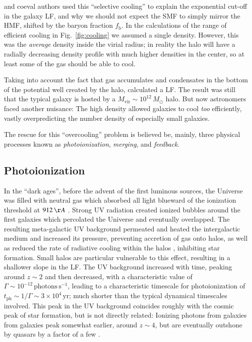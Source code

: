 \documentclass[useAMS]{aa}
\begin{document}
\citet{Rees1977} and coeval authors \citep[e.g.][]{Binney1977,Silk1977} used this ``selective cooling'' to explain the exponential cut-off in the galaxy LF, and why we should not expect the SMF to simply mirror the HMF, shifted by the baryon fraction $f_\mathrm{b}$.
In the calculations of the range of efficient cooling in Fig.~\ref{fig:cooling} we assumed a single density.
However, this was the \emph{average} density inside the virial radius; in reality the halo will have a radially decreasing density profile with much higher densities in the center, so at least some of the gas should be able to cool.

Taking into account the fact that gas accumulates and condensates in the bottom of the potential well created by the halo, \citet{White1978} calculated a LF.
The result was still that the typical galaxy is hosted by a $M_\mathrm{vir}\sim10^{12}\,M_\odot$ halo.
But now astronomers faced another nuisance:
The high density allowed galaxies to cool \emph{too} efficiently, vastly overpredicting the number density of especially small galaxies.

The rescue for this ``overcooling'' problem is believed be, mainly, three physical processes known as \emph{photoionization}, \emph{merging}, and \emph{feedback}.

\subsection{Photoionization}
\label{sec:reionization}

In the ``dark ages'', before the advent of the first luminous sources, the Universe was filled with neutral gas which absorbed all light blueward of the ionization threshold at $912\,{\AA}$ \citep{Gnedin2000,Barkana2001}.
Strong UV radiation created ionized bubbles around the first galaxies which percolated the Universe and eventually overlapped.
The resulting meta-galactic UV background permeated and heated the intergalactic medium and increased its pressure, preventing accretion of gas onto halos, as well as reduced the rate of radiative cooling within the halos \citep{Benson2002}, inhibiting star formation.
Small halos are particular vulnerable to this effect, resulting in a shallower slope in the LF.
The UV background increased with time, peaking around $z\sim2$ and then decreased, with a characteristic value of $\Gamma\sim10^{-12}\,\mathrm{photons}\,\mathrm{s}^{-1}$, leading to a characteristic timescale for photoionization of $t_\mathrm{ph} \sim 1/\Gamma \sim 3\times10^4\,\mathrm{yr}$; much shorter than the typical dynamical timescales involved.
This peak in the UV background coincides roughly with the cosmic peak of star formation, but is not directly related: Ionizing photons from galaxies from galaxies peak somewhat earlier, around $z\sim4$, but are eventually outshone by quasars by a factor of a few \citep[]{Haardt2012,Khaire2019}.
\end{document}
